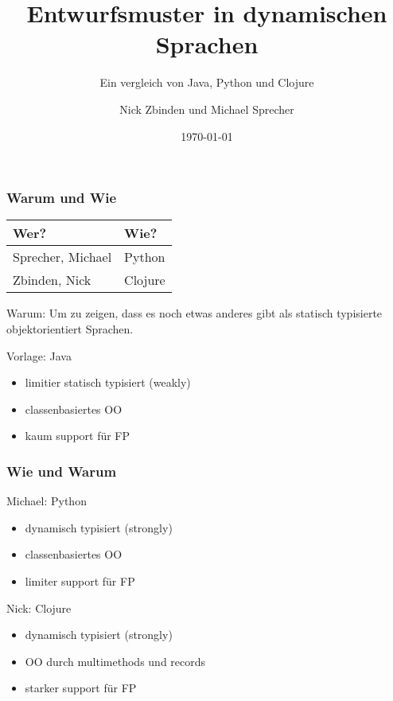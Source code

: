 \documentclass[compress, blue]{beamer}
\begin{document}
\title{Entwurfsmuster in dynamischen Sprachen}
\subtitle{Ein vergleich von Java, Python und Clojure}
\author{Nick Zbinden und Michael Sprecher}
\date{\today}

\begin{frame}
  \titlepage
\end{frame}

\begin{frame}\frametitle{Warum und Wie}

\begin{center}
\begin{tabular}{l  l}
  Wer? & Wie?\\
  \hline
  Sprecher, Michael & Python\\
  Zbinden, Nick & Clojure\\
\end{tabular}
\end{center}
\vspace{0.2cm}

\begin{block}{Warum:}
  Um zu zeigen, dass es noch etwas anderes gibt als statisch
  typisierte objektorientiert Sprachen.
\end{block}

\begin{block}{Vorlage: Java}
  \begin{itemize}
    \item limitier statisch typisiert (weakly)
    \item classenbasiertes OO
    \item kaum support für FP
  \end{itemize}
\end{block}

\end{frame}

\begin{frame}\frametitle{Wie und Warum}

\begin{block}{Michael: Python}
  \begin{itemize}
    \item dynamisch typisiert (strongly)
    \item classenbasiertes OO
    \item limiter support für FP
  \end{itemize}
\end{block} 

\begin{block}{Nick: Clojure}
  \begin{itemize}
    \item dynamisch typisiert (strongly)
    \item OO durch multimethods und records
    \item starker support für FP
  \end{itemize}
\end{block}
\end{frame}
\end{document}
